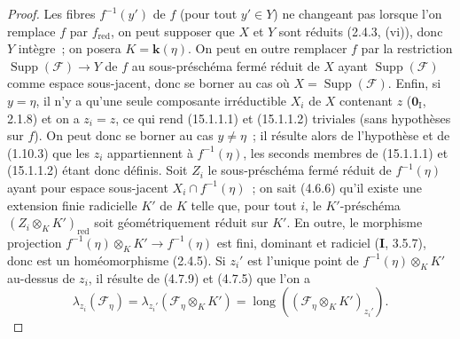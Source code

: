 \begin{proof}
Les fibres $f^{-1}(y')$ de $f$ (pour tout $y'\in Y$) ne changeant pas lorsque
l'on remplace $f$ par $f_{\mathrm{red}}$, on peut supposer que $X$ et $Y$ sont
réduits (2.4.3, (vi)), donc $Y$ intègre~; on posera
$K=\boldsymbol{k}(\eta)$. On peut en outre remplacer $f$ par la restriction
$\operatorname{Supp}(\mathcal F)\to Y$ de $f$ au sous-préschéma fermé réduit de
$X$ ayant $\operatorname{Supp}(\mathcal F)$ comme espace sous-jacent, donc se
borner au cas où $X=\operatorname{Supp}(\mathcal F)$. Enfin, si $y=\eta$, il n'y
a qu'une seule composante irréductible $X_i$ de $X$ contenant $z$
($\mathbf{0}_{\mathrm I}$, 2.1.8) et on a $z_i=z$, ce qui rend (15.1.1.1) et
(15.1.1.2) triviales (sans hypothèses sur $f$). On peut donc se borner au cas
$y\ne\eta$~; il résulte alors de l'hypothèse et de (1.10.3) que les $z_i$
appartiennent à $f^{-1}(\eta)$, les seconds membres de (15.1.1.1) et
(15.1.1.2) étant donc définis. Soit $Z_i$ le sous-préschéma fermé réduit de
$f^{-1}(\eta)$ ayant pour espace sous-jacent $X_i\cap f^{-1}(\eta)$~; on sait
(4.6.6) qu'il existe une extension finie radicielle $K'$ de $K$ telle que, pour
tout $i$, le $K'$-préschéma $(Z_i\otimes_K K')_{\mathrm{red}}$ soit
géométriquement réduit sur $K'$. En outre, le morphisme projection
$f^{-1}(\eta)\otimes_K K'\to f^{-1}(\eta)$ est fini, dominant et radiciel
(\textbf{I}, 3.5.7), donc est un homéomorphisme (2.4.5). Si $z_i'$ est l'unique
point de $f^{-1}(\eta)\otimes_K K'$ au-dessus de $z_i$, il résulte de (4.7.9) et
(4.7.5) que l'on a
\[
\tag{15.1.1.3}
\label{IV.15.1.1.3-fr}
  \lambda_{z_i}(\mathcal F_\eta)
  =\lambda_{z_i'}(\mathcal F_\eta\otimes_K K')
  =\operatorname{long}((\mathcal F_\eta\otimes_K K')_{z_i'}).
\]


\end{proof}
